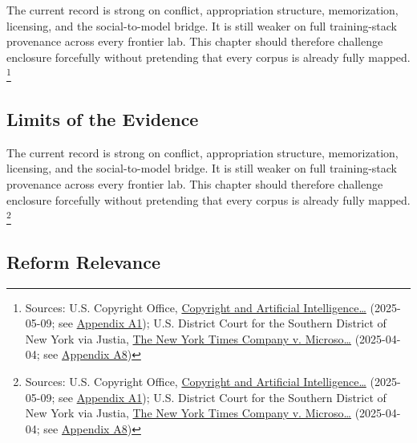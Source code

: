 \documentclass[
  american,
  11pt,
  letterpaper,
]{article}
\begin{document}
The current record is strong on conflict, appropriation structure,
memorization, licensing, and the social-to-model bridge. It is still
weaker on full training-stack provenance across every frontier lab. This
chapter should therefore challenge enclosure forcefully without
pretending that every corpus is already fully mapped. \footnote{Sources:
  U.S. Copyright Office,
  \href{https://copyright.gov/ai/Copyright-and-Artificial-Intelligence-Part-3-Generative-AI-Training-Report-Pre-Publication-Version.pdf}{Copyright
  and Artificial Intelligence\ldots{}} (2025-05-09; see
  \hyperref[ch-04-appendix-a1-copyright-and-artificial-intelligence-part-3-generative-ai-training-pre-publication-version]{Appendix
  A1}); U.S. District Court for the Southern District of New York via
  Justia,
  \href{https://cases.justia.com/federal/district-courts/new-york/nysdce/1\%3A2023cv11195/612697/514/0.pdf?ts=1743868265}{The
  New York Times Company v. Microso\ldots{}} (2025-04-04; see
  \hyperref[ch-04-appendix-a8-the-new-york-times-company-v-microsoft-corporation-et-al-opinion-on-motions-to-dismiss]{Appendix
  A8})}

\subsection{Limits of the Evidence}\label{limits-of-the-evidence-4}

The current record is strong on conflict, appropriation structure,
memorization, licensing, and the social-to-model bridge. It is still
weaker on full training-stack provenance across every frontier lab. This
chapter should therefore challenge enclosure forcefully without
pretending that every corpus is already fully mapped. \footnote{Sources:
  U.S. Copyright Office,
  \href{https://copyright.gov/ai/Copyright-and-Artificial-Intelligence-Part-3-Generative-AI-Training-Report-Pre-Publication-Version.pdf}{Copyright
  and Artificial Intelligence\ldots{}} (2025-05-09; see
  \hyperref[ch-04-appendix-a1-copyright-and-artificial-intelligence-part-3-generative-ai-training-pre-publication-version]{Appendix
  A1}); U.S. District Court for the Southern District of New York via
  Justia,
  \href{https://cases.justia.com/federal/district-courts/new-york/nysdce/1\%3A2023cv11195/612697/514/0.pdf?ts=1743868265}{The
  New York Times Company v. Microso\ldots{}} (2025-04-04; see
  \hyperref[ch-04-appendix-a8-the-new-york-times-company-v-microsoft-corporation-et-al-opinion-on-motions-to-dismiss]{Appendix
  A8})}

\subsection{Reform Relevance}\label{reform-relevance-4}
\end{document}
